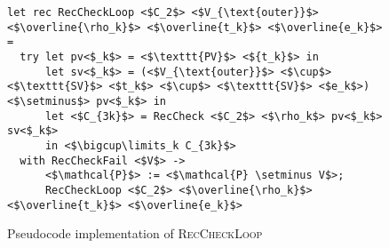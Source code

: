 \begin{figure}
\centering
\small

\begin{verbatim}
let rec RecCheckLoop <$C_2$> <$V_{\text{outer}}$> <$\overline{\rho_k}$> <$\overline{t_k}$> <$\overline{e_k}$> =
  try let pv<$_k$> = <$\texttt{PV}$> <${t_k}$> in
      let sv<$_k$> = (<$V_{\text{outer}}$> <$\cup$> <$\texttt{SV}$> <$t_k$> <$\cup$> <$\texttt{SV}$> <$e_k$>) <$\setminus$> pv<$_k$> in
      let <$C_{3k}$> = RecCheck <$C_2$> <$\rho_k$> pv<$_k$> sv<$_k$>
      in <$\bigcup\limits_k C_{3k}$>
  with RecCheckFail <$V$> ->
      <$\mathcal{P}$> := <$\mathcal{P} \setminus V$>;
      RecCheckLoop <$C_2$> <$\overline{\rho_k}$> <$\overline{t_k}$> <$\overline{e_k}$>
\end{verbatim}

\caption{Pseudocode implementation of \textsc{RecCheckLoop}}
\label{fig:helpers}
\end{figure}
